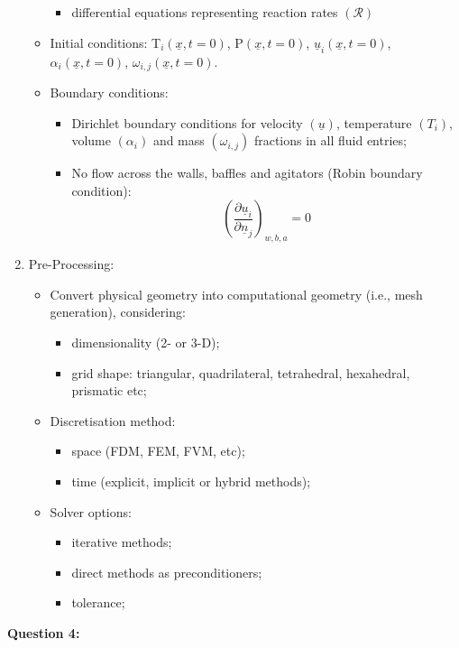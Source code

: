 \documentclass[12pts,a4paper,amsmath,amssymb,floatfix]{article}%
\newcounter{reaction}
\newcommand{\frc}{\displaystyle\frac}
\begin{document}
\begin{enumerate}
\begin{itemize}
\begin{itemize}
\item differential equations representing reaction rates $\left(\mathcal{R}\right)$
\end{itemize}
\item  Initial conditions: T$_{i}\left(\underline{x},t=0\right)$, P$\left(\underline{x},t=0\right)$, $\underline{u}_{i}\left(\underline{x},t=0\right)$, $\alpha_{i}\left(\underline{x},t=0\right)$, $\omega_{i,j}\left(\underline{x},t=0\right)$.  
\item Boundary conditions:
\begin{itemize}
\item Dirichlet boundary conditions for velocity $\left(\underline{u}\right)$, temperature $\left(T_{i}\right)$, volume $\left(\alpha_{i}\right)$ and mass $\left(\omega_{i,j}\right)$ fractions in all fluid entries;
\item No flow across the walls, baffles and agitators (Robin boundary condition):
\begin{displaymath}
\left(\frc{\partial \underline{u}_{i}}{\partial \underline{n}_{j}}\right)_{w,b,a}=0
\end{displaymath}
\end{itemize}
\end{itemize}
%
\item Pre-Processing:
\begin{itemize}
\item Convert physical geometry into computational geometry (i.e., mesh generation), considering:
\begin{itemize}
\item dimensionality (2- or 3-D);
\item grid shape: triangular, quadrilateral, tetrahedral, hexahedral, prismatic etc;
\end{itemize} 
\item Discretisation method:
\begin{itemize}
\item space (FDM, FEM, FVM, etc);
\item time (explicit, implicit or hybrid methods);
\end{itemize}
\item Solver options:
\begin{itemize}
\item iterative methods;
\item direct methods as preconditioners;
\item tolerance;
\end{itemize}
\end{itemize}
%
\end{enumerate}

\clearpage

\begin{flushleft}
{\bf Question 4:}
\end{flushleft}
\end{document}
